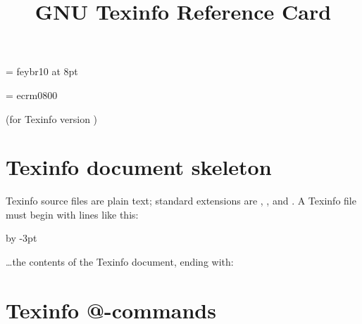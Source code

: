 \def\registeredsymbol{%
 \raise.8ex\hbox{{{\ooalign{\hfil\raise.07ex\hbox{\fiverm R}%
              \hfil\crcr\Orb}}%
   }}%
}

\def\ordf{\leavevmode\raise1ex\hbox{\fiverm \underbar{a}}}
\def\ordm{\leavevmode\raise1ex\hbox{\fiverm \underbar{o}}}

\font\eurofont = feybr10 at 8pt
\def\euro{{\eurofont e}}

\font\ecfont = ecrm0800
\def\DH{{\ecfont \char"D0}} %
\def\dh{{\ecfont \char"F0}} %
\def\TH{{\ecfont \char"DE}} %
\def\th{{\ecfont \char"FE}} %
\def\guillemetleft{{\ecfont \char"13}}
\def\guillemotleft{\guillemetleft}
\def\guillemetright{{\ecfont \char"14}}
\def\guillemotright{\guillemetright}
\def\guilsinglleft{{\ecfont \char"0E}}
\def\guilsinglright{{\ecfont \char"0F}}
\def\quotedblbase{{\ecfont \char"12}}
\def\quotesinglbase{{\ecfont \char"0D}}
\def\ogonek#1{{%
    \ecfont \setbox0=\hbox{#1}%
    \ifdim\ht0=1ex\accent"0C #1%
    \else\ooalign{\unhbox0\crcr\hidewidth\char"0C \hidewidth}%
    \fi
}}
\def\quoteleft{`}
\def\quoteright{'}
\def\quotedblleft{``}
\def\quotedblright{''}


% 
\title{GNU Texinfo Reference Card}

\centerline{(for Texinfo version \versionTexinfo)}
\vskip1pt
\centerline{}

\chapter{Texinfo document skeleton}

Texinfo source files are plain text; standard extensions are
, , and .  A Texinfo file must
begin with lines like this:

{\advance\baselineskip by -3pt
\linebreak
{}\linebreak
{}}

\dots the contents of the Texinfo document,
ending with:\linebreak
{}


\chapter{Texinfo @-commands}

